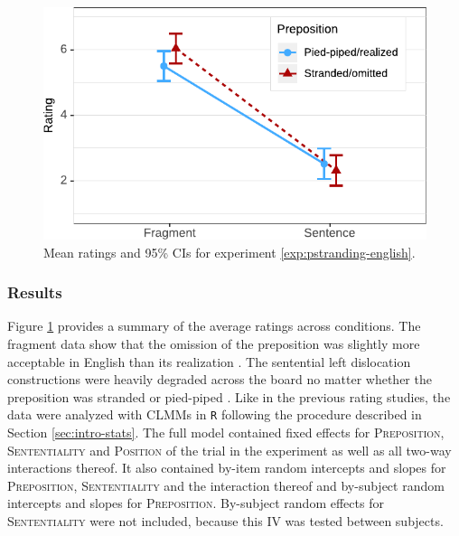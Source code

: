 \begin{figure}
\includegraphics[scale=1]{figures/pst_en_estimates}
 \caption{Mean ratings and 95\% CIs for experiment \ref{exp:pstranding-english}. \label{fig:pstranding-english-estimates}}
\end{figure}

\subsubsection{Results} \label{sec:pstranding-english-results}

Figure \ref{fig:pstranding-english-estimates} provides a summary of the average ratings across conditions. The fragment data show that the omission of the preposition was slightly more acceptable in English  than its realization . The sentential left dislocation constructions were heavily degraded across the board no matter whether the preposition was stranded   or pied-piped . Like in the previous rating studies, the data were analyzed with CLMMs in \texttt{R} following the procedure described in Section \ref{sec:intro-stats}. The full model contained fixed effects for \textsc{Preposition}, \textsc{Sententiality} and \textsc{Position} of the trial in the experiment as well as all two-way interactions thereof. It also contained by-item random intercepts and slopes for \textsc{Preposition}, \textsc{Sententiality} and the interaction thereof and by-subject random intercepts and slopes for \textsc{Preposition}. By-subject random effects for \textsc{Sententiality} were not included, because this IV was tested between subjects. 

